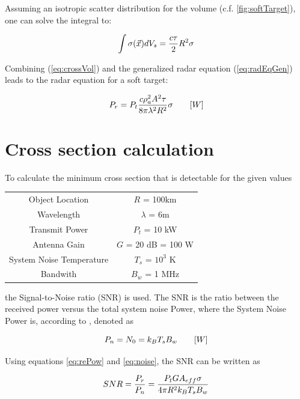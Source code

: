 Assuming an isotropic scatter distribution for the volume (c.f. \ref{fig:softTarget}), one can solve the integral to:

\begin{equation}
	\label{eq:crossVol}
	\centering
	\int \sigma(\vec{x}) dV_s = \frac{ c \tau}{2} R^2 \sigma
\end{equation}

Combining (\ref{eq:crossVol}) and the generalized radar equation (\ref{eq:radEqGen}) leads to the radar equation for a soft target:

\begin{equation}
\label{eq:radEqSoft}
	\centering
	P_{r} = P_t \frac{c \rho_a^2 A^2 \tau}{8 \pi \lambda^2 R^2} \sigma \qquad [W]
\end{equation}


\section{Cross section calculation}
To calculate the minimum cross section that is detectable for the given values

\begin{center}
\begin{tabular}{c c}
	Object Location & $R$ = 100km \\
	Wavelength & $\lambda$ = 6m \\
	Transmit Power & $P_t$ = 10 kW \\
	Antenna Gain & $G$ = 20 dB = 100 W\\
	System Noise Temperature & $T_s$ = $10^3$ K \\
	Bandwith & $B_w$ = 1 MHz
\end{tabular}
\end{center}

the Signal-to-Noise ratio (SNR) is used. The SNR is the ratio between the received power versus the total system noise Power, where the System Noise Power is, according to , denoted as

\begin{equation}
\label{eq:noise}
	\centering
	P_n = N_0 = k_B T_s B_w \qquad [W]
\end{equation}

Using equations \ref{eq:rePow} and \ref{eq:noise}, the SNR can be written as

\begin{equation}
\label{eq:snr}
	\centering
	SNR = \frac{P_r}{P_n} = \frac{P_t G A_{eff} \sigma}{4 \pi R^2 k_B T_s B_w}
\end{equation}

